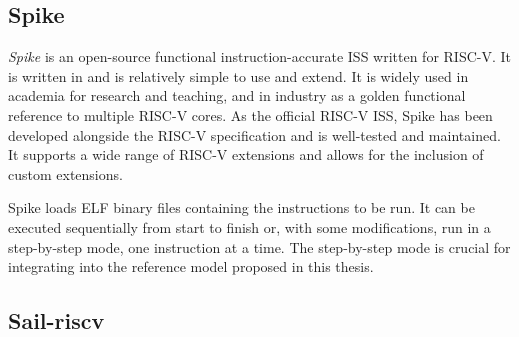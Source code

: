 \subsection{Spike}
\label{sec:spike}

\textit{Spike} \cite{SpikeRISCVISA2023} is an open-source functional instruction-accurate ISS written for RISC-V. It is written in \cpp and is relatively simple to use and extend. It is widely used in academia for research and teaching, and in industry as a golden functional reference to multiple RISC-V cores. As the official RISC-V ISS, Spike has been developed alongside the RISC-V specification and is well-tested and maintained. It supports a wide range of RISC-V extensions and allows for the inclusion of custom extensions.

Spike loads ELF binary files containing the instructions to be run. It can be executed sequentially from start to finish or, with some modifications, run in a step-by-step mode, one instruction at a time. The step-by-step mode is crucial for integrating into the reference model proposed in this thesis.








\subsection{Sail-riscv}
\label{sec:sail}

